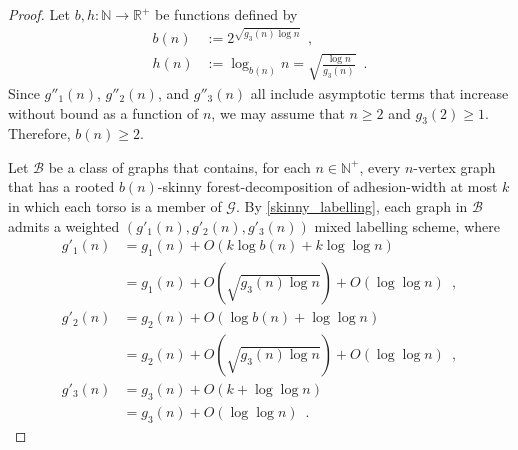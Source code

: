 \documentclass[twoside,leqno]{article}
\newcommand{\R}{\mathbb{R}}
\newcommand{\N}{\mathbb{N}}
\renewcommand{\ge}{\geqslant}
\newcommand{\Oh}{O}
\begin{document}
\begin{proof}
  Let $b,h:\N\to\R^+$ be functions defined by
  \begin{align*}
    b(n)
     & :=2^{\sqrt{g_3(n)\log n}}\enspace,                        \\
    h(n)
     & := \log_{b(n)}n = \sqrt{\frac{\log n}{g_3(n)}} \enspace .
  \end{align*}
  Since $g''_1(n)$, $g''_2(n)$, and $g''_3(n)$ all include asymptotic terms that increase without bound as a function of $n$, we may assume that $n\ge 2$ and $g_3(2)\ge 1$.  Therefore, $b(n)\ge 2$.

  Let $\mathcal{B}$ be a class of graphs that contains, for each $n\in\N^+$, every $n$-vertex graph that has a rooted $b(n)$-skinny forest-decomposition of adhesion-width at most $k$ in which each torso is a member of $\mathcal{G}$.
  By \cref{skinny_labelling}, each graph in $\mathcal{B}$ admits a
  weighted $(g'_1(n),g'_2(n),g'_3(n))$ mixed labelling scheme, where
  \begin{align*}
    g'_1(n)
     & = g_1(n) + \Oh(k \log b(n) + k \log\log n)                                 \\
     & = g_1(n) + \Oh\left(\sqrt{g_3(n) \log n}\right) + \Oh(\log\log n)\enspace, \\
    g'_2(n)
     & = g_2(n)+ \Oh(\log b(n) + \log\log n)                                      \\
     & = g_2(n) + \Oh\left(\sqrt{g_3(n) \log n}\right) + \Oh(\log\log n)\enspace, \\
    g'_3(n)
     & = g_3(n) + \Oh(k + \log\log n)                                             \\
     & = g_3(n) + \Oh(\log\log n)\enspace.
  \end{align*}


\end{proof}
\end{document}
